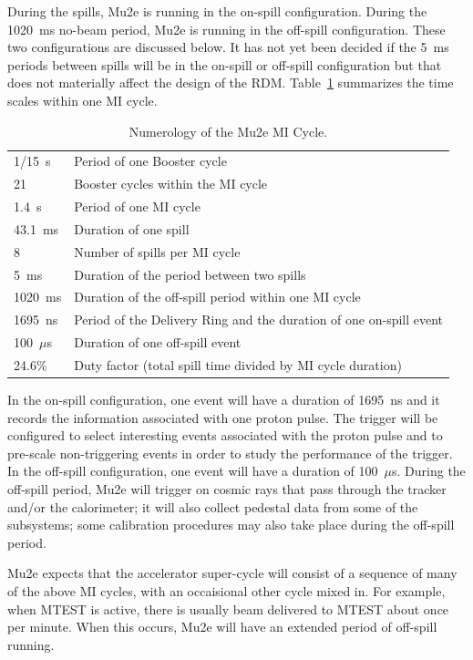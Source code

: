 During the spills, Mu2e is running in the on-spill configuration.
During the 1020~ms no-beam period, Mu2e is running in the off-spill configuration.
These two configurations are discussed below.
It has not yet been decided if the 5~ms periods between spills will
be in the on-spill or off-spill configuration
but that does not materially affect the design of the RDM.
Table~\ref{tab:timescales} summarizes the time scales within one MI cycle.
\begin{table}
\begin{center}
\caption[Numerology of the Mu2e MI Cycle]{Numerology of the Mu2e MI Cycle.}
\label{tab:timescales}
\begin{tabular}{ll}\hline
   1/15~s & Period of one Booster cycle \\
   21     & Booster cycles within the MI cycle \\
   1.4~s  & Period of one MI cycle \\
   43.1~ms & Duration of one spill \\
   8       & Number of spills per MI cycle \\
    5~ms   & Duration of the period between two spills \\
   1020~ms & Duration of the off-spill period within one MI cycle \\
   1695~ns & Period of the Delivery Ring and the duration of one on-spill event\\
   100~$\mu$s & Duration of one off-spill event \\
   24.6\%     & Duty factor (total spill time divided by MI cycle duration)\\
   \hline
  \end{tabular}
\end{center}
\end{table}


In the on-spill configuration, one event will have  a duration of 1695~ns
and it records the information associated with one proton pulse.
The trigger will be configured to select interesting events associated with the proton pulse
and to pre-scale non-triggering events in order to study the performance of the trigger.
In the off-spill configuration, one event will have a duration of 100~$\mu$s.
During the off-spill period, Mu2e will trigger on cosmic rays that
pass through the tracker and/or the calorimeter; it will also collect
pedestal data from some of the subsystems; some calibration procedures
may also take place during the off-spill period.

Mu2e expects that the accelerator super-cycle will consist of a
sequence of many of the above MI cycles,
with an occaisional other cycle mixed in.
For example, when MTEST is active, there is usually beam delivered to MTEST about once per minute.
When this occurs, Mu2e will have an extended period of off-spill running.

